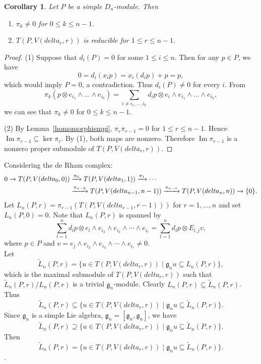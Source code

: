 \documentclass[12pt,a4paper]{amsart}
\def\mg{g}%
\def\delta{delta}%
\newtheorem{corollary}[theorem]{Corollary}%
\numberwithin{equation}{section}
\def\mg{\mathfrak{g}}
\begin{document}
\begin{corollary}\label{reducible}
Let \(P\) be a simple \(D_n\)-module. Then
\begin{enumerate}
\item \(\pi_k\neq0\) for \(0\leq k\leq n-1\).
\item\(T(P,V(\delta_r,r))\) is reducible for \(1\leq r\leq n-1\).
\end{enumerate}
\end{corollary}

\begin{proof}
(1) Suppose that $d_i(P)=0$ for some $1\leq i\leq n$. Then for any $p\in P$, we have
$$0=d_i(x_ip)=x_i(d_ip)+p=p,$$
which would imply \(P=0\), a contradiction. Thus \(d_i(P)\neq0\)
for every \(i\). From
$$\pi_k(p\otimes e_{i_1}\wedge\dots \wedge e_{i_k})= \sum_{i\neq i_1,\dots,i_k}d_ip\otimes e_i \wedge  e_{i_1}\wedge\dots \wedge e_{i_k},$$
we can see that \(\pi_k\neq0\) for \(0\leq k\leq n-1\).

(2)
By Lemma~\ref{homomorphismpi},
\(\pi_r\pi_{r-1}=0\) for \(1\leq r\leq n-1\). Hence
$
\operatorname{Im}\pi_{r-1}\subseteq\ker\pi_r.
$
By (1), both maps are nonzero.
Therefore \(\operatorname{Im}\pi_{r-1}\) is a nonzero proper
submodule of \(T(P,V(\delta_r,r))\).
\end{proof}

Considering the de Rham complex:
\begin{equation}\aligned \label{complex}
0 \rightarrow T(P,V(\delta_0,0)) &\xrightarrow{\pi_0} T(P,V(\delta_1,1)) \xrightarrow{\pi_1} \cdots\\
 &\xrightarrow{\pi_{n-2}} T(P,V(\delta_{n-1},n-1)) \xrightarrow{\pi_{n-1}} T(P,V(\delta_n,n)) \rightarrow \{0\}.
\endaligned\end{equation}
Let $L_n(P,r)=\pi_{r-1}(T(P,V(\delta_{r-1},r-1)))$ for $r=1,\dots, n$ and set $L_n(P,0)=0$. Note that $L_n(P,r)$ is spanned by
\begin{equation}\label{L_n}
\sum^n_{l=1}d_lp\otimes e_l\wedge e_{i_2}\wedge e_{i_3}\wedge \cdots \wedge e_{i_r}=\sum^n_{l=1}d_lp\otimes E_{l,j}v,
\end{equation}
where $p\in P$ and $v=e_j\wedge e_{i_2}\wedge e_{i_3}\wedge \cdots \wedge e_{i_r}\neq0$.\\
Let
$$\tilde{L}_n(P,r)=\{u\in T(P,V(\delta_r,r)) \mid \mg_nu\subseteq L_n(P,r)\},$$
which is the maximal submodule of $T(P,V(\delta_r,r))$
such that $\tilde{L}_n(P,r)/L_n(P,r)$ is a trivial $\mg_n$-module.
Clearly \(L_n(P,r)\subseteq\tilde L_n(P,r)\). Thus
$$\tilde{L}_n(P,r)\subseteq \{u\in T(P,V(\delta_r,r)) \mid \mg_nu\subseteq \tilde{L}_n(P,r)\}.$$
Since $\mg_n$ is a simple Lie algebra, $\mg_n=[\mg_n,\mg_n]$, we have
$$\tilde{L}_n(P,r)\supseteq \{u\in T(P,V(\delta_r,r)) \mid \mg_nu\subseteq \tilde{L}_n(P,r)\}.$$
Then
$$\tilde{L}_n(P,r)= \{u\in T(P,V(\delta_r,r)) \mid \mg_nu\subseteq \tilde{L}_n(P,r)\}.$$
.
\end{document}
